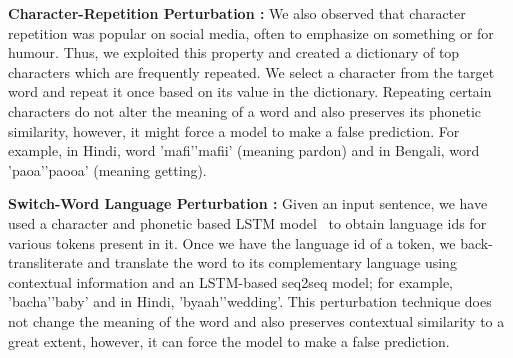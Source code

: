 \documentclass[sigconf]{acmart}
\begin{document}
\textbf{Character-Repetition Perturbation :}
We also observed that character repetition was popular on social media, often to emphasize on something or for humour. Thus, we exploited this property and created a dictionary of top characters which are frequently repeated.
We select a character from the target word and repeat it once based on its value in the dictionary. Repeating certain characters do not alter the meaning of a word and also preserves its phonetic similarity, however, it might force a model to make a false prediction.
For example, in Hindi, word 'mafi'\textrightarrow'mafii' (meaning pardon) and in Bengali, word 'paoa'\textrightarrow'paooa' (meaning getting). 

\textbf{Switch-Word Language Perturbation :}
Given an input sentence, we have used a character and phonetic based LSTM model~\cite{mandal2018language} to obtain language ids for various tokens present in it. Once we have the language id of a token, we back-transliterate and translate the word to its complementary language using contextual information and an LSTM-based seq2seq model; for example, 'bacha'\textrightarrow'baby' and in Hindi, 'byaah'\textrightarrow'wedding'. This perturbation technique does not change the meaning of the word and also preserves contextual similarity to a great extent, however, it can force the model to make a false prediction.
\end{document}

